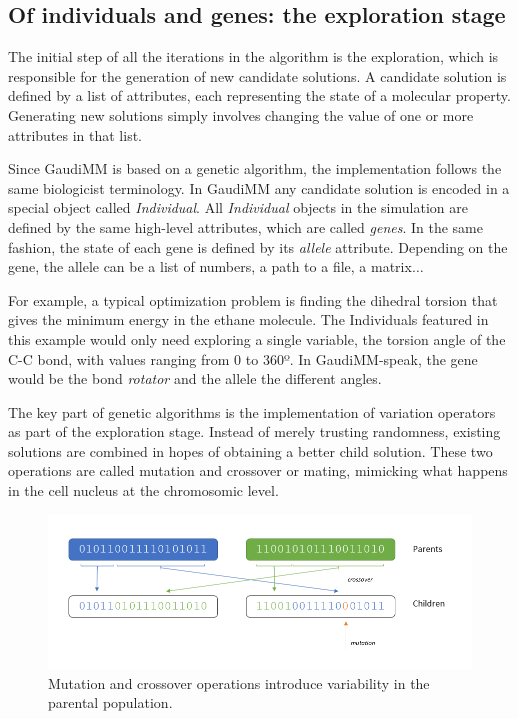 \subsection{Of individuals and genes: the exploration stage}
The initial step of all the iterations in the algorithm is the exploration, which is responsible for the generation of new candidate solutions. A candidate solution is defined by a list of attributes, each representing the state of a molecular property. Generating new solutions simply involves changing the value of one or more attributes in that list.

Since GaudiMM is based on a genetic algorithm, the implementation follows the same biologicist terminology. In GaudiMM any candidate solution is encoded in a special object called \textit{Individual}. All \textit{Individual} objects in the simulation are defined by the same high-level attributes, which are called \textit{genes}. In the same fashion, the state of each gene is defined by its \textit{allele} attribute. Depending on the gene, the allele can be a list of numbers, a path to a file, a matrix$ \ldots $

For example, a typical optimization problem is finding the dihedral torsion that gives the minimum energy in the ethane molecule. The Individuals featured in this example would only need exploring a single variable, the torsion angle of the C-C bond, with values ranging from 0 to 360º. In GaudiMM-speak, the gene would be the bond \textit{rotator} and the allele the different angles.

The key part of genetic algorithms is the implementation of variation operators as part of the exploration stage. Instead of merely trusting randomness, existing solutions are combined in hopes of obtaining a better child solution. These two operations are called mutation and crossover or mating, mimicking what happens in the cell nucleus at the chromosomic level.





\begin{figure}[H] %
	\includegraphics[width=\textwidth]{./figures/04/ga-crossover-mut.png}
	\caption[Mutation and crossover]{Mutation and crossover operations introduce variability in the parental population.}
	\label{fig:cxmut}
\end{figure}



